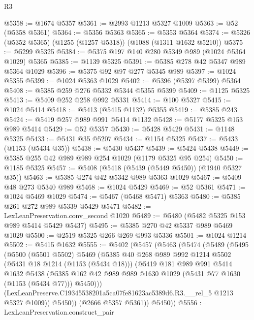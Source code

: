\begin{lexlean}{R3}
\begin{coremodule}
@5358 := @1674 @5357
@5361 := @2993 @1213 @5327 @1009
@5363 := @52 (@5358 @5361)
@5364 := @5356 @5363
@5365 := @5353 @5364
@5374 := @5326 (@5352 @5365) (@1255 (@1257 @5318)) (@1088 (@1311 @1632 @5210))
@5375 := @5299 @5325
@5384 := @5375 @197 @140 @280 @5349 @989 (@1024 @5364 @1029) @5365
@5385 := @1139 @5325
@5391 := @5385 @278 @42 @5347 @989 @5364 @1029
@5396 := @5375 @92 @97 @277 @5345 @989
@5397 := @1024 @5355
@5399 := @1024 @5363 @1029
@5402 := @5396 (@5397 @5399) @5364
@5408 := @5385 @259 @276 @5332 @5344 @5355 @5399
@5409 := @1125 @5325
@5413 := @5409 @252 @258 @992 @5331
@5414 := @100 @5327
@5415 := @1024 @5414
@5418 := @5413 (@5415 @1132) @5355
@5419 := @5385 @243
@5424 := @5419 @257 @989 @991 @5414 @1132
@5428 := @5177 @5325 @153 @989 @5414
@5429 := @52 @5357
@5430 := @5428 @5429
@5431 := @1148 @5325
@5433 := @5431 @35 @5207
@5434 := @1154 @5325
@5437 := @5433 (@1153 (@5434 @35))
@5438 := @5430 @5437
@5439 := @5424 @5438
@5449 := @5385 @255 @42 @989 @989 @254 @1029 (@1179 @5325 @95 @254)
@5450 := @1185 @5325
@5457 := @5408 (@5418 (@5439 (@5449 @5450)) (@1940 @5327 @35))
@5463 := @5385 @274 @42 @5342 @989 @5363 @1029
@5467 := @5409 @48 @273 @5340 @989
@5468 := @1024 @5429
@5469 := @52 @5361
@5471 := @1024 @5469 @1029
@5474 := @5467 (@5468 @5471) @5363
@5480 := @5385 @261 @272 @989 @5339 @5429 @5471
@5482 := LexLeanPreservation.conv_second @1020
@5489 := @5480 (@5482 @5325 @153 @989 @5414 @5429 @5437)
@5495 := @5385 @270 @42 @5337 @989 @5469 @1029
@5500 := @2519 @5325 @266 @269 @993 @5336
@5501 := @1024 @1214
@5502 := @5415 @1632
@5555 := @5402
    (@5457
      (@5463
        (@5474
          (@5489
            (@5495
              (@5500
                (@5501 @5502)
                @5469
                (@5385
                  @40
                  @268
                  @989
                  @992
                  @1214
                  @5502
                  (@5431 @18 @1214 (@1153 (@5434 @18)))
                  (@5419
                    @181
                    @989
                    @991
                    @5414
                    @1632
                    @5438
                    (@5385
                      @162
                      @42
                      @989
                      @989
                      @1630
                      @1029
                      (@5431 @77 @1630 (@1153 (@5434 @77)))
                      @5450)))
                (LexLeanPreserve.C19345538201a5ca07fe81623ac5389d6.R3.__rel_5 @1213 @5327 @1009))
              @5450))
          (@2666 @5357 @5361))
        @5450))
@5556 := LexLeanPreservation.construct_pair

\end{coremodule}
\end{lexlean}
